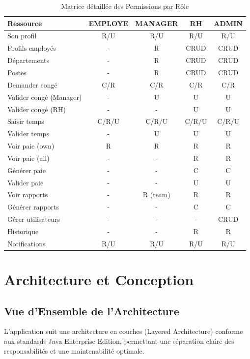 \documentclass[12pt,a4paper,twoside]{report}
\begin{document}
\begin{table}[H]
\centering
\caption{Matrice détaillée des Permissions par Rôle}
\label{tab:permissions}
\small
\begin{tabular}{|l|c|c|c|c|}
\hline
\textbf{Ressource} & \textbf{EMPLOYE} & \textbf{MANAGER} & \textbf{RH} & \textbf{ADMIN} \\
\hline
Son profil & R/U & R/U & R/U & R/U \\
\hline
Profils employés & - & R & CRUD & CRUD \\
\hline
Départements & - & R & CRUD & CRUD \\
\hline
Postes & - & R & CRUD & CRUD \\
\hline
Demander congé & C/R & C/R & C/R & C/R \\
\hline
Valider congé (Manager) & - & U & U & U \\
\hline
Valider congé (RH) & - & - & U & U \\
\hline
Saisir temps & C/R/U & C/R/U & C/R/U & C/R/U \\
\hline
Valider temps & - & U & U & U \\
\hline
Voir paie (own) & R & R & R & R \\
\hline
Voir paie (all) & - & - & R & R \\
\hline
Générer paie & - & - & C & C \\
\hline
Valider paie & - & - & U & U \\
\hline
Voir rapports & - & R (team) & R & R \\
\hline
Générer rapports & - & - & C & C \\
\hline
Gérer utilisateurs & - & - & - & CRUD \\
\hline
Historique & - & - & R & R \\
\hline
Notifications & R/U & R/U & R/U & R/U \\
\hline
\end{tabular}
\end{table}

\chapter{Architecture et Conception}

\section{Vue d'Ensemble de l'Architecture}

L'application suit une architecture en couches (Layered Architecture) conforme aux standards Java Enterprise Edition, permettant une séparation claire des responsabilités et une maintenabilité optimale.
\end{document}
